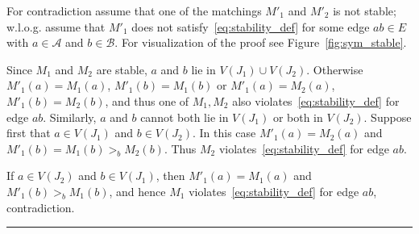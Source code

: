 \documentclass[3p,times]{elsarticle}
\newenvironment{proof}{{\bf Proof:  }}{\hfill\rule{2mm}{2mm}}
\begin{document}
\begin{proof}
  For contradiction assume
  that one of the matchings $M'_1$ and $M'_2$ is not stable; w.l.o.g. assume that
  $M'_1$ does not satisfy~\eqref{eq:stability_def} for some edge
  $ab\in E$ with $a\in\mathcal{A}$ and $b\in\mathcal{B}$. For visualization of the proof see Figure~\ref{fig:sym_stable}.

  Since $M_1$ and $M_2$ are stable, $a$ and $b$ lie in $V(J_1)\cup V(J_2)$. Otherwise $M'_1(a)=M_1(a)$,  $M'_1(b)=M_1(b)$ or  $M'_1(a)=M_2(a)$,  $M'_1(b)=M_2(b)$, and thus one of $M_1, M_2$ also violates~\eqref{eq:stability_def} for edge $ab$. Similarly, $a$ and $b$ cannot both lie in $V(J_1)$ or both in  $V(J_2)$. Suppose first that $a \in V(J_1)$ and $b \in V(J_2)$. In this case $M'_1(a)=M_2(a)$ and
  $M'_1(b) = M_1(b) >_b M_2(b)$. Thus $M_2$
  violates~\eqref{eq:stability_def} for edge $ab$. 

  If $a\in V(J_2)$
  and $b\in V(J_1)$, then $M'_1(a)=M_1(a)$ and $M'_1(b)>_b M_1(b)$,
  and hence $M_1$ violates~\eqref{eq:stability_def} for edge $ab$,
  contradiction.
\end{proof}
\end{document}
